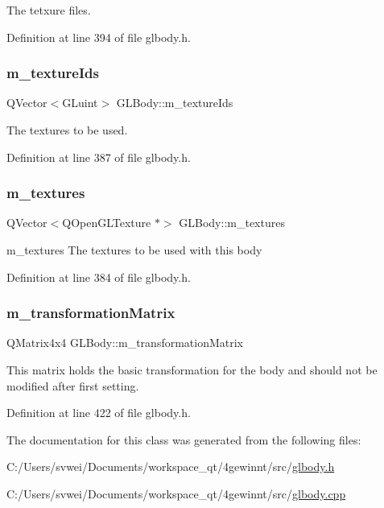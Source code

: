 The tetxure files. 

Definition at line 394 of file glbody.\+h.

\mbox{\label{class_g_l_body_a29c73dfe014e2452dd3a2011929aada3}} 
\subsubsection{\texorpdfstring{m\_textureIds}{m\_textureIds}}
{\footnotesize\ttfamily Q\+Vector$<$G\+Luint$>$ G\+L\+Body\+::m\+\_\+texture\+Ids\hspace{0.3cm}{\ttfamily [protected]}}

The textures to be used. 

Definition at line 387 of file glbody.\+h.

\mbox{\label{class_g_l_body_a741719ede9df7cadd89ff3f86a71eccf}} 
\subsubsection{\texorpdfstring{m\_textures}{m\_textures}}
{\footnotesize\ttfamily Q\+Vector$<$Q\+Open\+G\+L\+Texture $\ast$$>$ G\+L\+Body\+::m\+\_\+textures\hspace{0.3cm}{\ttfamily [protected]}}



m\+\_\+textures The textures to be used with this body 



Definition at line 384 of file glbody.\+h.

\mbox{\label{class_g_l_body_a38b323efc7e55b6c770638cd108c2143}} 
\subsubsection{\texorpdfstring{m\_transformationMatrix}{m\_transformationMatrix}}
{\footnotesize\ttfamily Q\+Matrix4x4 G\+L\+Body\+::m\+\_\+transformation\+Matrix\hspace{0.3cm}{\ttfamily [protected]}}

This matrix holds the basic transformation for the body and should not be modified after first setting. 

Definition at line 422 of file glbody.\+h.



The documentation for this class was generated from the following files\+:\begin{DoxyCompactItemize}
\item 
C\+:/\+Users/svwei/\+Documents/workspace\+\_\+qt/4gewinnt/src/\mbox{\hyperlink{glbody_8h}{glbody.\+h}}\item 
C\+:/\+Users/svwei/\+Documents/workspace\+\_\+qt/4gewinnt/src/\mbox{\hyperlink{glbody_8cpp}{glbody.\+cpp}}\end{DoxyCompactItemize}
